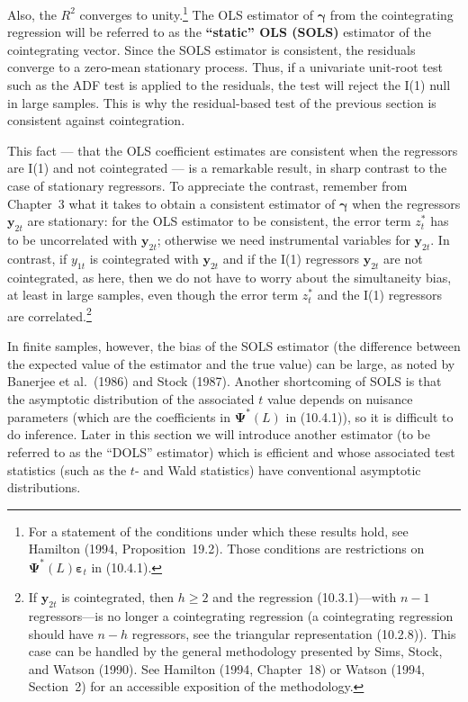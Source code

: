 Also, the $R^2$ converges to unity.\footnote{%
For a statement of the conditions under which these results hold, see Hamilton (1994, Proposition~19.2).
Those conditions are restrictions on $\boldsymbol{\Psi}^*(L)\boldsymbol{\varepsilon}_t$ in (10.4.1).}
The OLS estimator of $\boldsymbol{\gamma}$
from the cointegrating regression will be referred to as the \textbf{``static'' OLS (SOLS)}
estimator of the cointegrating vector. Since the SOLS estimator is consistent, the
residuals converge to a zero-mean stationary process. Thus, if a univariate unit-root
test such as the ADF test is applied to the residuals, the test will reject the I(1)
null in large samples. This is why the residual-based test of the previous section is
consistent against cointegration.

This fact --- that the OLS coefficient estimates are consistent when the regres\-sors
are I(1) and not cointegrated --- is a remarkable result, in sharp contrast to the
case of stationary regressors. To appreciate the contrast, remember from Chap\-ter~3
what it takes to obtain a consistent estimator of $\boldsymbol{\gamma}$ when the regressors $\mathbf{y}_{2t}$
are stationary: for the OLS estimator to be consistent, the error term $z_t^*$ has to be
uncorrelated with $\mathbf{y}_{2t}$; otherwise we need instrumental variables for $\mathbf{y}_{2t}$. In contrast,
if $y_{1t}$ is cointegrated with $\mathbf{y}_{2t}$ and if the I(1) regressors $\mathbf{y}_{2t}$ are not cointegrated, as
here, then we do not have to worry about the simultaneity bias, at least in large
samples, even though the error term $z_t^*$ and the I(1) regressors are correlated.\footnote{%
If $\mathbf{y}_{2t}$ is cointegrated, then $h \geq 2$ and the regression (10.3.1)---with $n - 1$ regressors---is no longer a
cointegrating regression (a cointegrating regression should have $n - h$ regressors, see the triangular representation
(10.2.8)). This case can be handled by the general methodology presented by Sims, Stock, and Watson (1990).
See Hamilton (1994, Chapter~18) or Watson (1994, Section~2) for an accessible exposition of the methodology.}

In finite samples, however, the bias of the SOLS estimator (the difference
between the expected value of the estimator and the true value) can be large, as
noted by Banerjee et al.\ (1986) and Stock (1987). Another shortcoming of SOLS
is that the asymptotic distribution of the associated $t$ value depends on nuisance
parameters (which are the coefficients in $\boldsymbol{\Psi}^*(L)$ in (10.4.1)), so it is difficult to do
inference. Later in this section we will introduce another estimator (to be referred
to as the ``DOLS'' estimator) which is efficient and whose associated test statistics
(such as the $t$- and Wald statistics) have conventional asymptotic distributions.

